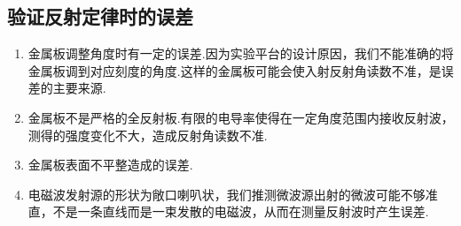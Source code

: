\documentclass[a4paper]{article}
\begin{document}
\subsection{验证反射定律时的误差}
\begin{enumerate}
\item 金属板调整角度时有一定的误差.因为实验平台的设计原因，我们不能准确的将金属板调到对应刻度的角度.这样的金属板可能会使入射反射角读数不准，是误差的主要来源.
\item 金属板不是严格的全反射板.有限的电导率使得在一定角度范围内接收反射波，测得的强度变化不大，造成反射角读数不准.
\item 金属板表面不平整造成的误差.
\item 电磁波发射源的形状为敞口喇叭状，我们推测微波源出射的微波可能不够准直，不是一条直线而是一束发散的电磁波，从而在测量反射波时产生误差.
\end{enumerate}

\nocite{jiaocai}

\end{document}
